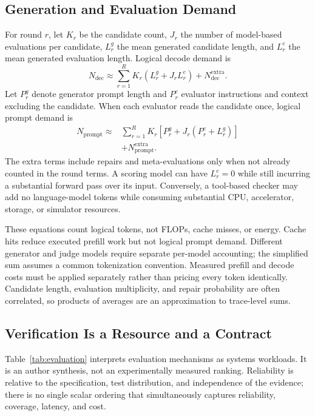 \documentclass[journal]{IEEEtran}
\begin{document}
\subsection{Generation and Evaluation Demand}
For round $r$, let $K_r$ be the candidate count, $J_r$ the number of model-based evaluations per candidate, $L_r^g$ the mean generated candidate length, and $L_r^e$ the mean generated evaluation length. Logical decode demand is
\begin{equation}
N_{\mathrm{dec}}\approx\sum_{r=1}^{R}K_r\left(L_r^g+J_rL_r^e\right)+N_{\mathrm{dec}}^{\mathrm{extra}}.
\label{eq:improve-decode}
\end{equation}
Let $P_r^g$ denote generator prompt length and $P_r^e$ evaluator instructions and context excluding the candidate. When each evaluator reads the candidate once, logical prompt demand is
\begin{equation}
\begin{aligned}
N_{\mathrm{prompt}}\approx{}&\sum_{r=1}^{R}K_r\left[P_r^g+J_r(P_r^e+L_r^g)\right]\\
&+N_{\mathrm{prompt}}^{\mathrm{extra}}.
\end{aligned}
\label{eq:improve-prefill}
\end{equation}
The extra terms include repairs and meta-evaluations only when not already counted in the round terms. A scoring model can have $L_r^e=0$ while still incurring a substantial forward pass over its input. Conversely, a tool-based checker may add no language-model tokens while consuming substantial CPU, accelerator, storage, or simulator resources.

These equations count logical tokens, not FLOPs, cache misses, or energy. Cache hits reduce executed prefill work but not logical prompt demand. Different generator and judge models require separate per-model accounting; the simplified sum assumes a common tokenization convention. Measured prefill and decode costs must be applied separately rather than pricing every token identically. Candidate length, evaluation multiplicity, and repair probability are often correlated, so products of averages are an approximation to trace-level sums.

\subsection{Verification Is a Resource and a Contract}
Table~\ref{tab:evaluation} interprets evaluation mechanisms as systems workloads. It is an author synthesis, not an experimentally measured ranking. Reliability is relative to the specification, test distribution, and independence of the evidence; there is no single scalar ordering that simultaneously captures reliability, coverage, latency, and cost.
\end{document}
